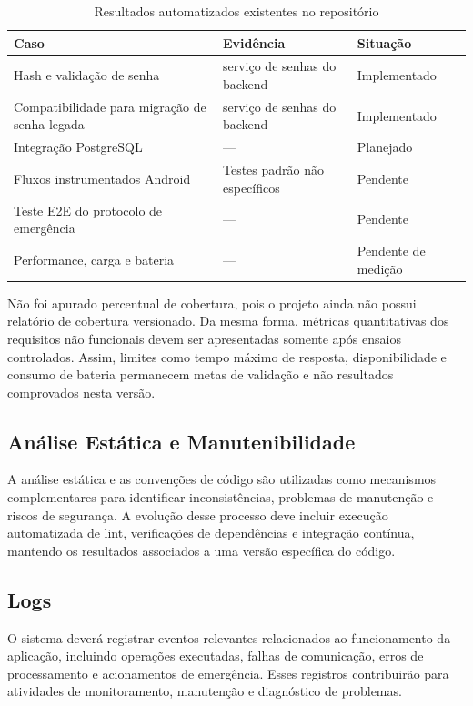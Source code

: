 \begin{table}[H]
\caption{Resultados automatizados existentes no repositório}
\label{tab_resultados_testes}
\centering
\footnotesize
\begin{tabular}{p{5cm}p{4cm}p{4cm}}
\hline
\textbf{Caso} & \textbf{Evidência} & \textbf{Situação} \\
\hline
Hash e validação de senha & serviço de senhas do backend & Implementado \\
Compatibilidade para migração de senha legada & serviço de senhas do backend & Implementado \\
Integração PostgreSQL & --- & Planejado \\
Fluxos instrumentados Android & Testes padrão não específicos & Pendente \\
Teste E2E do protocolo de emergência & --- & Pendente \\
Performance, carga e bateria & --- & Pendente de medição \\
\hline
\end{tabular}
\end{table}

Não foi apurado percentual de cobertura, pois o projeto ainda não possui relatório de cobertura versionado. Da mesma forma, métricas quantitativas dos requisitos não funcionais devem ser apresentadas somente após ensaios controlados. Assim, limites como tempo máximo de resposta, disponibilidade e consumo de bateria permanecem metas de validação e não resultados comprovados nesta versão.

\subsection{Análise Estática e Manutenibilidade}

A análise estática e as convenções de código são utilizadas como mecanismos complementares para identificar inconsistências, problemas de manutenção e riscos de segurança. A evolução desse processo deve incluir execução automatizada de lint, verificações de dependências e integração contínua, mantendo os resultados associados a uma versão específica do código.

\subsection{Logs}

O sistema deverá registrar eventos relevantes relacionados ao funcionamento da aplicação, incluindo operações executadas, falhas de comunicação, erros de processamento e acionamentos de emergência. Esses registros contribuirão para atividades de monitoramento, manutenção e diagnóstico de problemas.

